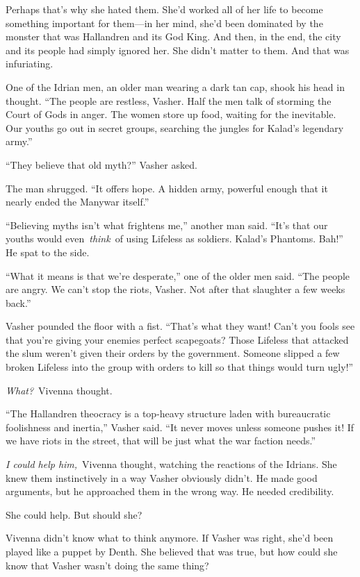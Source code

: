 Perhaps that’s why she hated them. She’d worked all of her life to become something important for them—in her mind, she’d been dominated by the monster that was Hallandren and its God King. And then, in the end, the city and its people had simply ignored her. She didn’t matter to them. And that was infuriating.

One of the Idrian men, an older man wearing a dark tan cap, shook his head in thought. “The people are restless, Vasher. Half the men talk of storming the Court of Gods in anger. The women store up food, waiting for the inevitable. Our youths go out in secret groups, searching the jungles for Kalad’s legendary army.”

“They believe that old myth?” Vasher asked.

The man shrugged. “It offers hope. A hidden army, powerful enough that it nearly ended the Manywar itself.”

“Believing myths isn’t what frightens me,” another man said. “It’s that our youths would even~\textit{think}~of using Lifeless as soldiers. Kalad’s Phantoms. Bah!” He spat to the side.

“What it means is that we’re desperate,” one of the older men said. “The people are angry. We can’t stop the riots, Vasher. Not after that slaughter a few weeks back.”

Vasher pounded the floor with a fist. “That’s what they want! Can’t you fools see that you’re giving your enemies perfect scapegoats? Those Lifeless that attacked the slum weren’t given their orders by the government. Someone slipped a few broken Lifeless into the group with orders to kill so that things would turn ugly!”

\textit{What?}~Vivenna thought.

“The Hallandren theocracy is a top-heavy structure laden with bureaucratic foolishness and inertia,” Vasher said. “It never moves unless someone pushes it! If we have riots in the street, that will be just what the war faction needs.”

\textit{I could help him,}~Vivenna thought, watching the reactions of the Idrians. She knew them instinctively in a way Vasher obviously didn’t. He made good arguments, but he approached them in the wrong way. He needed credibility.

She could help. But should she?

Vivenna didn’t know what to think anymore. If Vasher was right, she’d been played like a puppet by Denth. She believed that was true, but how could she know that Vasher wasn’t doing the same thing?

